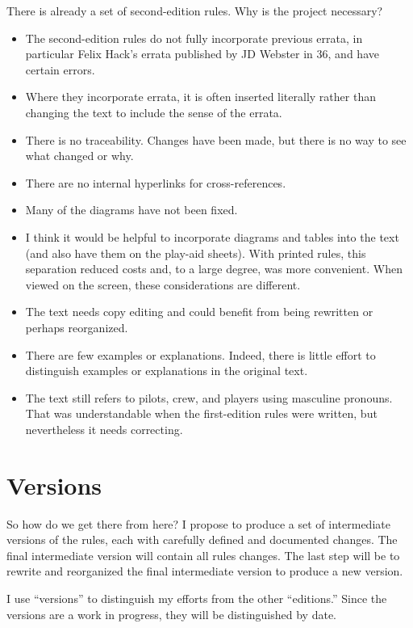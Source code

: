 \documentclass[10pt]{report}
\begin{document}
There is already a set of second-edition rules. Why is the project necessary?
\begin{itemize}
    \item The second-edition rules do not fully incorporate previous errata, in particular Felix Hack’s errata published by JD Webster in {\APJ} 36, and have certain errors.
    \item Where they incorporate errata, it is often inserted literally rather than changing the text to include the sense of the errata.
    \item There is no traceability. Changes have been made, but there is no way to see what changed or why.
    \item There are no internal hyperlinks for cross-references.
    \item Many of the diagrams have not been fixed.
    \item I think it would be helpful to incorporate diagrams and tables into the text (and also have them on the play-aid sheets). With printed rules, this separation reduced costs and, to a large degree, was more convenient. When viewed on the screen, these considerations are different.
    \item The text needs copy editing and could benefit from being rewritten or perhaps reorganized.
    \item There are few examples or explanations. Indeed, there is little effort to distinguish examples or explanations in the original text.
    \item The text still refers to pilots, crew, and players using masculine pronouns. That was understandable when the first-edition rules were written, but nevertheless it needs correcting.
\end{itemize}

\section{Versions}

So how do we get there from here? I propose to produce a set of intermediate versions of the rules, each with carefully defined and documented changes. The final intermediate version will contain all rules changes. The last step will be to rewrite and reorganized the final intermediate version to produce a new version.

I use “versions” to distinguish my efforts from the other “editions.” Since the versions are a work in progress, they will be distinguished by date.
\end{document}
